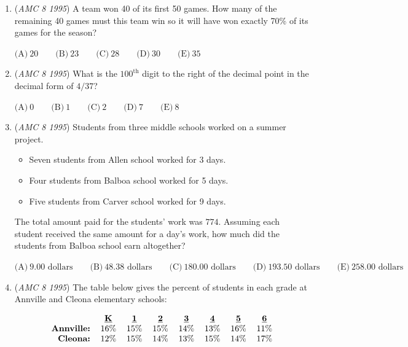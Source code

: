 \begin{enumerate}
$\text{(A)}\ 75^\circ \qquad \text{(B)}\ 80^\circ \qquad \text{(C)}\ 85^\circ \qquad \text{(D)}\ 90^\circ \qquad \text{(E)}\ 95^\circ$


	\item (\textit{AMC 8 1995}) A team won 40 of its first 50 games.  How many of the remaining 40 games must this team win so it will have won exactly 70\% of its games for the season?


 $\text{(A)}\ 20 \qquad \text{(B)}\ 23 \qquad \text{(C)}\ 28 \qquad \text{(D)}\ 30 \qquad \text{(E)}\ 35$


	\item (\textit{AMC 8 1995}) What is the $100^\text{th}$ digit to the right of the decimal point in the decimal form of $4/37$?


 $\text{(A)}\ 0 \qquad \text{(B)}\ 1 \qquad \text{(C)}\ 2 \qquad \text{(D)}\ 7 \qquad \text{(E)}\ 8$


	\item (\textit{AMC 8 1995}) Students from three middle schools worked on a summer project.


 
            \begin{itemize}
        \item Seven students from Allen school worked for 3 days.

        \item Four students from Balboa school worked for 5 days.

        \item Five students from Carver school worked for 9 days.
            \end{itemize}
            The total amount paid for the students' work was $774$.  Assuming each student received the same amount for a day's work, how much did the students from Balboa school earn altogether?


 $\text{(A)}\ 9.00\text{ dollars} \qquad \text{(B)}\ 48.38\text{ dollars} \qquad \text{(C)}\ 180.00\text{ dollars} \qquad \text{(D)}\ 193.50\text{ dollars} \qquad \text{(E)}\ 258.00\text{ dollars}$


	\item (\textit{AMC 8 1995}) The table below gives the percent of students in each grade at Annville and Cleona elementary schools:


 
 \[\begin{tabular}{rccccccc}  & \textbf{\underline{K}} & \textbf{\underline{1}} & \textbf{\underline{2}} & \textbf{\underline{3}} & \textbf{\underline{4}} & \textbf{\underline{5}} & \textbf{\underline{6}} \\ \textbf{Annville:} & 16\% & 15\% & 15\% & 14\% & 13\% & 16\% & 11\% \\ \textbf{Cleona:} & 12\% & 15\% & 14\% & 13\% & 15\% & 14\% & 17\%  \end{tabular}\]



\end{enumerate}
